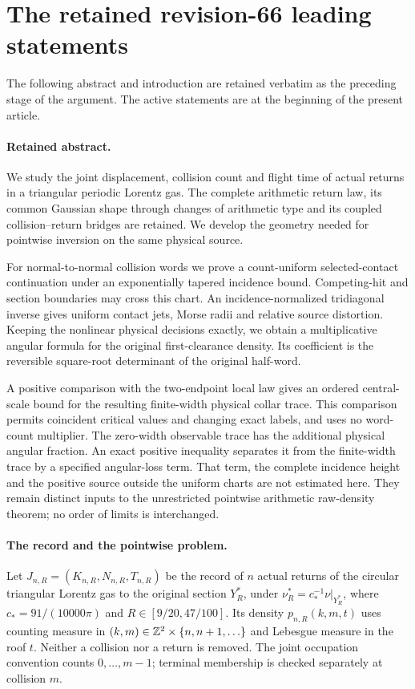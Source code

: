 \section{The retained revision-66 leading statements}
\label{app:v67-retained-front}
The following abstract and introduction are retained verbatim as the
preceding stage of the argument. The active statements are at the
beginning of the present article.
\paragraph{Retained abstract.}

We study the joint displacement, collision count and flight time of
actual returns in a triangular periodic Lorentz gas. The complete
arithmetic return law, its common Gaussian shape through changes of
arithmetic type and its coupled collision--return bridges are retained.
We develop the geometry needed for pointwise inversion on the same
physical source.

For normal-to-normal collision words we prove a count-uniform
selected-contact continuation under an exponentially tapered incidence
bound. Competing-hit and section boundaries may cross this chart.
An incidence-normalized tridiagonal inverse gives uniform contact jets,
Morse radii and relative source distortion. Keeping the nonlinear
physical decisions exactly, we obtain a multiplicative angular formula
for the original first-clearance density. Its coefficient is the
reversible square-root determinant of the original half-word.

A positive comparison with the two-endpoint local law gives an ordered
central-scale bound for the resulting finite-width physical collar
trace. This comparison permits coincident critical values and changing
exact labels, and uses no word-count multiplier. The zero-width
observable trace has the additional physical angular fraction. An exact
positive inequality separates it from the finite-width trace by a
specified angular-loss term. That term, the complete incidence height
and the positive source outside the uniform charts are not estimated
here. They remain distinct inputs to the unrestricted pointwise
arithmetic raw-density theorem; no order of limits is interchanged.



\paragraph{The record and the pointwise problem.}
Let $J_{n,R}=(K_{n,R},N_{n,R},T_{n,R})$ be the record of $n$ actual
returns of the circular triangular Lorentz gas to the original section
$Y_R^*$, under $\nu_R^*=c_*^{-1}\nu|_{Y_R^*}$, where
$c_*=91/(10000\pi)$ and $R\in[9/20,47/100]$. Its density
$p_{n,R}(k,m,t)$ uses counting measure in $(k,m)\in\mathbb Z^2\times\{n,n+1,\ldots\}$
and Lebesgue measure in the roof $t$. Neither a collision nor a return
is removed. The joint occupation convention counts $0,\ldots,m-1$;
terminal membership is checked separately at collision $m$.


